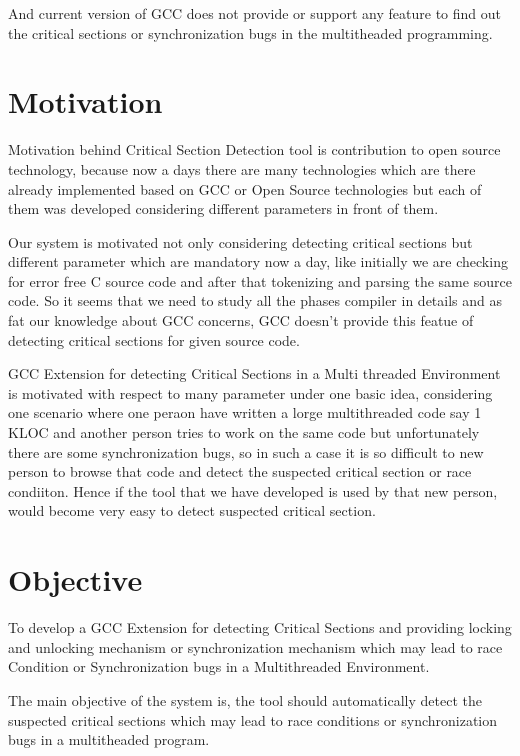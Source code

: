 And current version of GCC does not provide or support any feature to find out the critical sections or synchronization bugs in the multitheaded programming.

\section{Motivation}


Motivation behind Critical Section Detection tool is contribution to open source technology, because now a days there are many technologies which are there already implemented based on GCC or Open Source technologies but each of them was developed considering different parameters in front of them. 

Our system is motivated not only considering detecting critical sections but different parameter which are mandatory now a day, like initially we are checking for error free C source code and after that tokenizing and parsing the same source code. So it seems that we need to study all the phases compiler in details and as fat our knowledge about GCC concerns, GCC doesn't provide this featue of detecting critical sections for given source code.

GCC Extension for detecting Critical Sections in a Multi threaded Environment is motivated with respect to many parameter under one basic idea, considering one scenario where one peraon have written a lorge multithreaded code say 1 KLOC and another person tries to work on the same code but unfortunately there are some synchronization bugs, so in such a case it is so difficult to new person to browse that code and detect the suspected critical section or race condiiton. Hence if the tool that we have developed is used by that new person, would become very easy to detect suspected critical section.\\

\section{Objective}
To develop a GCC Extension for detecting Critical Sections and providing locking and unlocking mechanism or synchronization mechanism which may lead to race Condition or Synchronization bugs in a Multithreaded Environment.

The main objective of the system is, the tool should automatically detect the suspected critical sections which may lead to race conditions or synchronization bugs in a multitheaded program.

